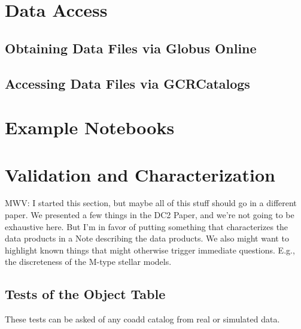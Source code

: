 \documentclass[11pt]{report}
\begin{document}



\section{Data Access}
\label{sec:access}

\subsection{Obtaining Data Files via Globus Online}

\subsection{Accessing Data Files via GCRCatalogs}

\section{Example Notebooks}
\label{sec:notebooks}

\section{Validation and Characterization}
\label{sec:validation}

MWV: I started this section, but maybe all of this stuff should go in a different paper.  We presented a few things in the DC2 Paper, and we're not going to be exhaustive here.  But I'm in favor of putting something that characterizes the data products in a Note describing the data products.
We also might want to highlight known things that might otherwise trigger immediate questions.  E.g., the discreteness of the M-type stellar models.

\subsection{Tests of the Object Table}

These tests can be asked of any coadd catalog from real or simulated data.
\end{document}

